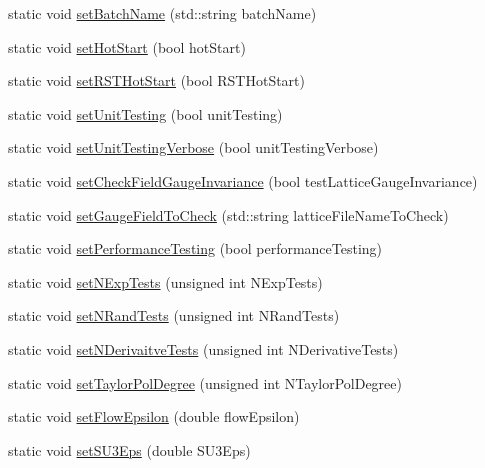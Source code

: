 \begin{DoxyCompactItemize}
\item 
static void \mbox{\hyperlink{class_parameters_a8e349761195db7184f309e0f074da84d}{set\+Batch\+Name}} (std\+::string batch\+Name)
\item 
static void \mbox{\hyperlink{class_parameters_af4a107cdc7b6400685fdcbd33983a16f}{set\+Hot\+Start}} (bool hot\+Start)
\item 
static void \mbox{\hyperlink{class_parameters_a84d9a6f8a32bbe13f7abe045453700a0}{set\+R\+S\+T\+Hot\+Start}} (bool R\+S\+T\+Hot\+Start)
\item 
static void \mbox{\hyperlink{class_parameters_a2d7077c967fffbdc6652559ec261b67c}{set\+Unit\+Testing}} (bool unit\+Testing)
\item 
static void \mbox{\hyperlink{class_parameters_a2cf1ae12581e8f80dd88ce6c60f37c5f}{set\+Unit\+Testing\+Verbose}} (bool unit\+Testing\+Verbose)
\item 
static void \mbox{\hyperlink{class_parameters_ad6a40d1cf972c0f1379cf011bb7da2b1}{set\+Check\+Field\+Gauge\+Invariance}} (bool test\+Lattice\+Gauge\+Invariance)
\item 
static void \mbox{\hyperlink{class_parameters_afba800600f057fa6ed8fb317add0af30}{set\+Gauge\+Field\+To\+Check}} (std\+::string lattice\+File\+Name\+To\+Check)
\item 
static void \mbox{\hyperlink{class_parameters_a0b9d1947d6a3a016ed196d97b548730d}{set\+Performance\+Testing}} (bool performance\+Testing)
\item 
static void \mbox{\hyperlink{class_parameters_a5cbf802e3e5db24cf0b8afc3f39f0830}{set\+N\+Exp\+Tests}} (unsigned int N\+Exp\+Tests)
\item 
static void \mbox{\hyperlink{class_parameters_a24bd9c86cda80898bc65b950983b6a17}{set\+N\+Rand\+Tests}} (unsigned int N\+Rand\+Tests)
\item 
static void \mbox{\hyperlink{class_parameters_ae924eabec82bfe600eda893c6f71b00e}{set\+N\+Derivaitve\+Tests}} (unsigned int N\+Derivative\+Tests)
\item 
static void \mbox{\hyperlink{class_parameters_a68fb3eccef5dae481915be728ef61fb6}{set\+Taylor\+Pol\+Degree}} (unsigned int N\+Taylor\+Pol\+Degree)
\item 
static void \mbox{\hyperlink{class_parameters_a9114804031d3c9342f590ce223a8b5a7}{set\+Flow\+Epsilon}} (double flow\+Epsilon)
\item 
static void \mbox{\hyperlink{class_parameters_af882fdb68c96c27f1bb99cebe3aecd21}{set\+S\+U3\+Eps}} (double S\+U3\+Eps)
\item 

\end{DoxyCompactItemize}
